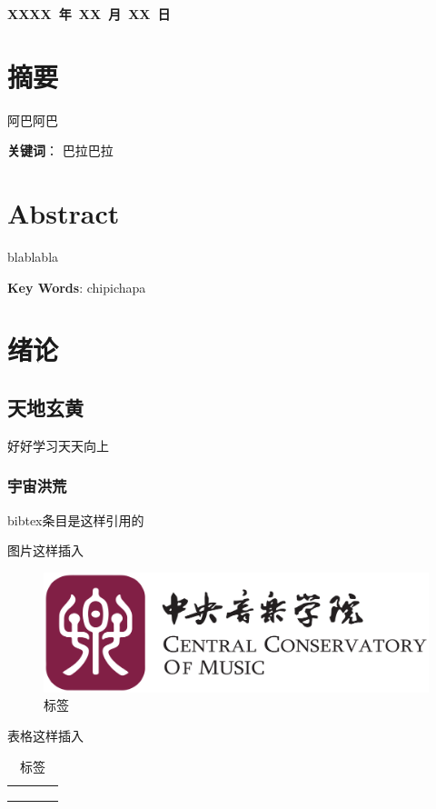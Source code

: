 \documentclass[a4paper,scheme=chinese,linespread=1.6]{ctexbook}
\begin{document}
{\hfill \textbf{XXXX~年~XX~月~XX~日}
\chapter*{摘要}
阿巴阿巴
\pagestyle{plain}





\textbf{关键词}：
巴拉巴拉
\chapter*{Abstract}
blablabla

\textbf{Key Words}:
chipichapa
\tableofcontents
\thispagestyle{empty}

\pagestyle{plain}

\chapter{绪论}
\section{天地玄黄}
好好学习天天向上
\subsection{宇宙洪荒}
bibtex条目是这样引用的\cite{kolasinski2008framework}

图片这样插入
\begin{figure}[ht!]
	\centering
	\includegraphics[width=0.85\columnwidth]{media/logo.png}
	\caption{标签}
	\label{fig:fig1-4}  %
\end{figure}

表格这样插入

\begin{table}[htbp]
	\centering
	\begin{tabular}{c|c c c} %
		\hline
		 &  &  & \\
		\hline
		 &  &  & \\
		 &  &  & \\
		 &  &  & \\
		\hline
	\end{tabular}
	\caption{标签}
	\label{tab:2-1} %
\end{table}

}
\end{document}
